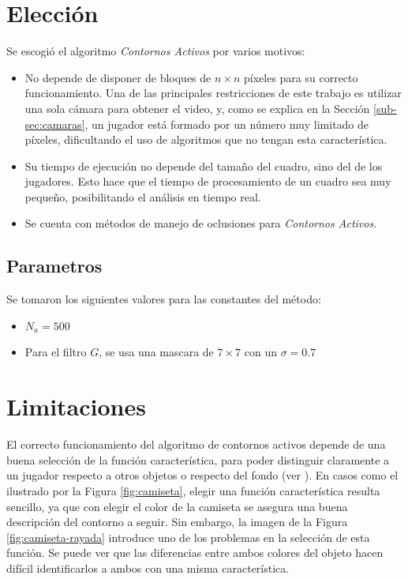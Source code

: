 \section{Elección}
\label{sec:eleccion}

Se escogió el algoritmo \emph{Contornos Activos} por varios motivos:
\begin{itemize}
    \item No depende de disponer de bloques de $n \times n$ píxeles para su
        correcto funcionamiento. Una de las principales restricciones de este
        trabajo es utilizar una sola cámara para obtener el video, y, como se
        explica en la Sección \ref{sub-sec:camaras}, un jugador está formado
        por un número muy limitado de píxeles, dificultando el uso de
        algoritmos que no tengan esta característica.

    \item Su tiempo de ejecución no depende del tamaño del cuadro, sino del
        de los jugadores. Esto hace que el tiempo de procesamiento de un cuadro
        sea muy pequeño, posibilitando el análisis en tiempo real.

    \item Se cuenta con métodos de manejo de oclusiones para
        \emph{Contornos Activos}\cite{paper-juliana}.

\end{itemize}

\subsection{Parametros}

Se tomaron los siguientes valores para las constantes del método:
\begin{itemize}
\item $N_a = 500$ 
\item Para el filtro $G$, se usa una mascara de $7 \times 7$ con un $\sigma = 0.7$ 
\end{itemize}

\section{Limitaciones}
\label{sec:ac-problemas}

El correcto funcionamiento del algoritmo de contornos activos depende de una
buena selección de la función característica, para poder distinguir claramente
a un jugador respecto a otros objetos o respecto del fondo (ver
\cite{fast-level-set}). En casos como el ilustrado por la Figura
\ref{fig:camiseta}, elegir una función característica resulta sencillo, ya que
con elegir el color de la camiseta se asegura una buena descripción del
contorno a seguir. Sin embargo, la imagen de la Figura
\ref{fig:camiseta-rayada} introduce uno de los problemas en la selección de
esta función. Se puede ver que las diferencias entre ambos colores del objeto
hacen difícil identificarlos a ambos con una misma característica.

